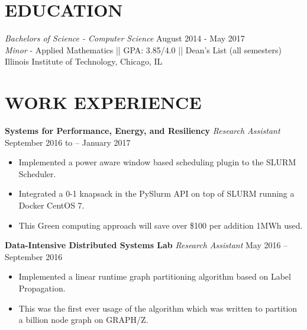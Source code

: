 \documentclass[11pt]{res}
\begin{document}
\address{  
	3522 South State Street Apt 307 Chicago IL 60609 || 
	smoudgal@hawk.iit.edu || 
    630-561-4088
}
\begin{resume}

\section{\Large {}\selectfont EDUCATION}
{\sl \large Bachelors of Science - Computer Science} \hfill August 2014 - May 2017\\
{\sl Minor} - Applied Mathematics || GPA: 3.85/4.0 || Dean’s List (all semesters) \\
Illinois Institute of Technology,  Chicago, IL
  \vspace{-2mm}


\section{\Large {}\selectfont WORK EXPERIENCE} {\bfseries \large
Systems for Performance, Energy, and Resiliency}
 \newline
 {\sl Research Assistant} \hfill  September 2016 to – January   2017\\
 \vspace{-2mm}
 \begin{itemize}
 \item Implemented a power aware window based scheduling plugin to the SLURM Scheduler.
 \item Integrated a 0-1 knapsack in the PySlurm API on top of SLURM running a Docker CentOS 7.
 \item This Green computing approach will save over \$100 per addition 1MWh used.
 \end{itemize}
   \vspace{-2mm}

{\bfseries \large Data-Intensive Distributed Systems Lab}
\newline 
{\sl Research Assistant} \hfill May 2016 – September 2016\\
  \vspace{-2mm}
  \begin{itemize}
  \item Implemented a linear runtime graph partitioning algorithm based on Label Propagation. 
  \item This was the first ever usage of the algorithm which was written to partition a billion node graph on GRAPH/Z. 
  \end{itemize}
    \vspace{-2mm}


\end{resume}
\end{document}
